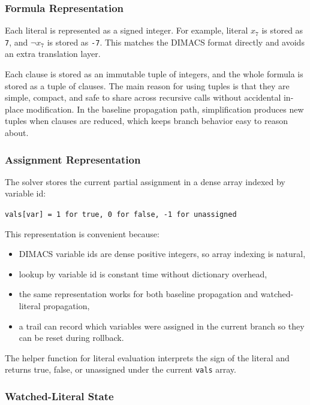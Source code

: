\documentclass[11pt]{article}
\begin{document}
\subsubsection{Formula Representation}

Each literal is represented as a signed integer. For example, literal $x_7$ is
stored as \texttt{7}, and $\neg x_7$ is stored as \texttt{-7}. This matches the
DIMACS format directly and avoids an extra translation layer.

Each clause is stored as an immutable tuple of integers, and the whole formula
is stored as a tuple of clauses. The main reason for using tuples is that they
are simple, compact, and safe to share across recursive calls without accidental
in-place modification. In the baseline propagation path, simplification produces new tuples
when clauses are reduced, which keeps branch behavior easy to reason about.

\subsubsection{Assignment Representation}

The solver stores the current partial assignment in a dense array indexed by
variable id:
\begin{center}
\texttt{vals[var] = 1 for true, 0 for false, -1 for unassigned}
\end{center}

This representation is convenient because:
\begin{itemize}
    \item DIMACS variable ids are dense positive integers, so array indexing is
    natural,
    \item lookup by variable id is constant time without dictionary overhead,
    \item the same representation works for both baseline propagation and
    watched-literal propagation,
    \item a trail can record which variables were assigned in the current
    branch so they can be reset during rollback.
\end{itemize}

The helper function for literal evaluation interprets the sign of the literal
and returns true, false, or unassigned under the current \texttt{vals} array.

\subsubsection{Watched-Literal State}
\end{document}
